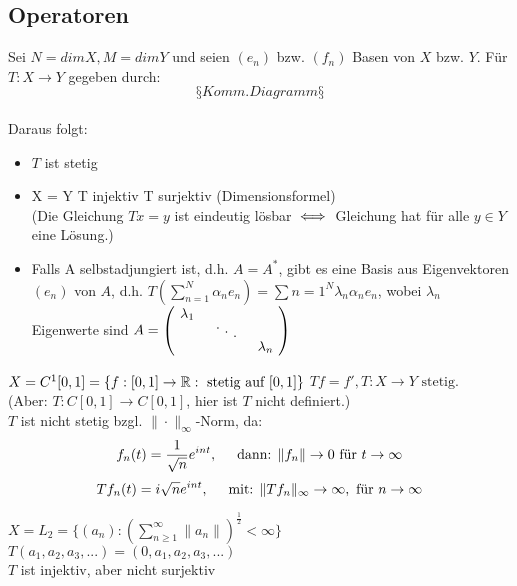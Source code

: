 \subsection{Operatoren}

Sei $N = dim X, M = dim Y$ und seien $(e_n)$ bzw. $(f_n)$ Basen von $X$ bzw. $Y$.
Für $T : X \rightarrow Y$ gegeben durch: \\
\[ §Komm. Diagramm§ \] \\
Daraus folgt:
\begin{itemize}
	\item $T$ ist stetig
	\item X = Y \gdw T injektiv \gdw T surjektiv (Dimensionsformel) \\
	(Die Gleichung $Tx = y$ ist eindeutig lösbar $\iff$ Gleichung hat für alle $y \in Y$ eine Lösung.)
	\item Falls A selbstadjungiert ist, d.h. $A = A^{*}$, gibt es eine Basis aus Eigenvektoren $(e_{n})$ von $A$, d.h. $ T( \sum_{n=1}^{N} \alpha_{n} e_{n} ) = \sum{n=1}^{N} \lambda_{n} \alpha_{n} e_{n}$, wobei $\lambda_{n}$ Eigenwerte sind $A =
			\begin{pmatrix}
				\diagentry{\lambda_{1}}\\
				&\diagentry{\xddots}\\
				&&\diagentry{\lambda_{n}}\\
			\end{pmatrix} $
\end{itemize}

\begin{beispiel}[1]
$X = C^{1}[0, 1] = \{ f : [0, 1] \rightarrow \mathbb{R}: \text{ stetig auf } [0, 1] \}$ 
$T f = f', T : X \rightarrow Y \text{ stetig.} $ \\
(Aber: $T: C[0, 1] \rightarrow C[0, 1]$, hier ist $T$ nicht definiert.) \\
$T$ ist nicht stetig bzgl. $\| \cdot \|_{\infty}$-Norm, da:
\[ f_{n}(t) = \frac{1}{\sqrt{n}}e^{int}, \hspace{0.5cm}  \text{dann: } \|f_{n}\| \rightarrow 0 \text{ für } t \rightarrow \infty \]	
\[ T f_{n}(t) = i \sqrt{n} e^{int}, \hspace{0.5cm} \text{mit: } \| T f_{n} \|_{\infty} \rightarrow \infty, \text{ für } n \rightarrow \infty \]
\end{beispiel}

\begin{beispiel}[2]
$X = L_{2} = \{ (a_{n}): \left( \sum_{n \geq 1}^{\infty} \| a_{n} \| \right)^{\frac{1}{2}} < \infty \}$	\\
$T ( a_{1}, a_{2}, a_{3}, ...) = ( 0, a_{1}, a_{2}, a_{3}, ...)$ \\
$T$ ist injektiv, aber nicht surjektiv
\end{beispiel}


